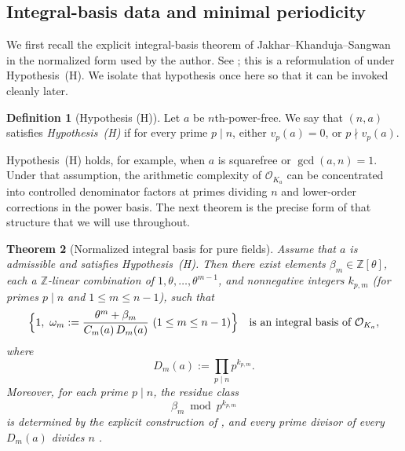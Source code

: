 \documentclass[11pt,letterpaper]{amsart}
\newcommand{\Z}{\mathbb{Z}}
\newcommand{\cO}{\mathcal{O}}
\theoremstyle{plain}
\newtheorem{theorem}{Theorem}[section]
\theoremstyle{definition}
\newtheorem{definition}[theorem]{Definition}
\begin{document}
\subsection{Integral-basis data and minimal periodicity}
We first recall the explicit integral-basis theorem of Jakhar--Khanduja--Sangwan in the normalized form
used by the author. See \cite[Theorem~2.1 and Remark~2.4]{NguyenDang2025MinPeriod}; this is a reformulation
of \cite[Theorem~1.6]{JakharKhandujaSangwan2021} under Hypothesis~\textup{(H)}. We isolate that hypothesis once here so that it can be invoked cleanly later.

\begin{definition}[Hypothesis (H)]\label{def:H}
Let $a$ be $n$th-power-free.
We say that $(n,a)$ satisfies \emph{Hypothesis~\textup{(H)}} if for every prime $p\mid n$, either
$v_p(a)=0$, or $p\nmid v_p(a)$.
\end{definition}

Hypothesis~\textup{(H)} holds, for example, when $a$ is squarefree or $\gcd(a,n)=1$. Under that assumption, the arithmetic complexity of \(\cO_{K_a}\) can be concentrated into controlled denominator factors at primes dividing \(n\) and lower-order corrections in the power basis. The next theorem is the precise form of that structure that we will use throughout.


\begin{theorem}[Normalized integral basis for pure fields]\label{thm:ND-basis}
Assume that $a$ is admissible and satisfies Hypothesis~\textup{(H)}.
Then there exist elements $\beta_m\in \Z[\theta]$, each a $\Z$-linear combination of
$1,\theta,\dots,\theta^{m-1}$, and nonnegative integers $k_{p,m}$ (for primes $p\mid n$ and
$1\le m\le n-1$), such that
\begin{equation}\label{eq:int-basis}
\Bigl\{1,\ \omega_m:=\frac{\theta^m+\beta_m}{C_m(a)\,D_m(a)}\ (1\le m\le n-1)\Bigr\}
\quad\text{is an integral basis of }\cO_{K_a},
\end{equation}
where
\[
D_m(a):=\prod_{p\mid n}p^{k_{p,m}}.
\]
Moreover, for each prime $p\mid n$, the residue class
\[
\beta_m \bmod p^{k_{p,m}}
\]
is determined by the explicit construction of \cite[Theorem~2.1]{NguyenDang2025MinPeriod}, and every prime
divisor of every $D_m(a)$ divides $n$ \cite[Remark~2.4]{NguyenDang2025MinPeriod}.
\end{theorem}
\end{document}

